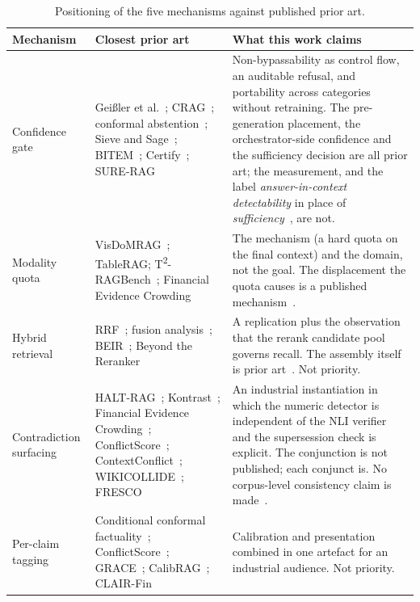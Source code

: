 \documentclass[preprint,3p,times]{elsarticle}
\begin{document}
\begin{table}[t]
\caption{Positioning of the five mechanisms against published prior art.}
\label{tab:positioning}
\centering
\small
\begin{tabular}{p{}p{}p{}}
\toprule
Mechanism & Closest prior art & What this work claims \\
\midrule
Confidence gate & Gei{\ss}ler et al.~\cite{geissler2026dependable}; CRAG~\cite{yan2024crag}; conformal abstention~\cite{yadkori2024conformal}; Sieve and Sage~\cite{won2026sievesage}; BITEM~\cite{knafou2026bitem}; Certify~\cite{zhang2026certify}; SURE-RAG~\cite{qiu2026surerag} & Non-bypassability as control flow, an auditable refusal, and portability across categories without retraining. The pre-generation placement, the orchestrator-side confidence and the sufficiency decision are all prior art; the measurement, and the label \emph{answer-in-context detectability} in place of \emph{sufficiency}~\cite{li2026relevance}, are not. \\
Modality quota & VisDoMRAG~\cite{suri2024visdom}; TableRAG; T\textsuperscript{2}-RAGBench~\cite{strich2026t2}; Financial Evidence Crowding~\cite{zhou2026crowding} & The mechanism (a hard quota on the final context) and the domain, not the goal. The displacement the quota causes is a published mechanism~\cite{zhou2026crowding}. \\
Hybrid retrieval & RRF~\cite{cormack2009rrf}; fusion analysis~\cite{bruch2023fusion}; BEIR~\cite{thakur2021beir}; Beyond the Reranker~\cite{singh2026beyondreranker} & A replication plus the observation that the rerank candidate pool governs recall. The assembly itself is prior art~\cite{singh2026beyondreranker}. Not priority. \\
Contradiction surfacing & HALT-RAG~\cite{goswami2025haltrag}; Kontrast~\cite{wei2026kontrast}; Financial Evidence Crowding~\cite{zhou2026crowding}; ConflictScore~\cite{liu2026conflictscore}; ContextConflict~\cite{yang2026contextconflict}; WIKICOLLIDE~\cite{semnani2025wikicollide}; FRESCO~\cite{an2026fresco} & An industrial instantiation in which the numeric detector is independent of the NLI verifier and the supersession check is explicit. The conjunction is not published; each conjunct is. No corpus-level consistency claim is made~\cite{semnani2025wikicollide}. \\
Per-claim tagging & Conditional conformal factuality~\cite{feng2025conformal}; ConflictScore~\cite{liu2026conflictscore}; GRACE~\cite{yi2026grace}; CalibRAG~\cite{jang2025calibrag}; CLAIR-Fin~\cite{faria2026clairfin} & Calibration and presentation combined in one artefact for an industrial audience. Not priority. \\
\bottomrule
\end{tabular}
\end{table}
\end{document}
